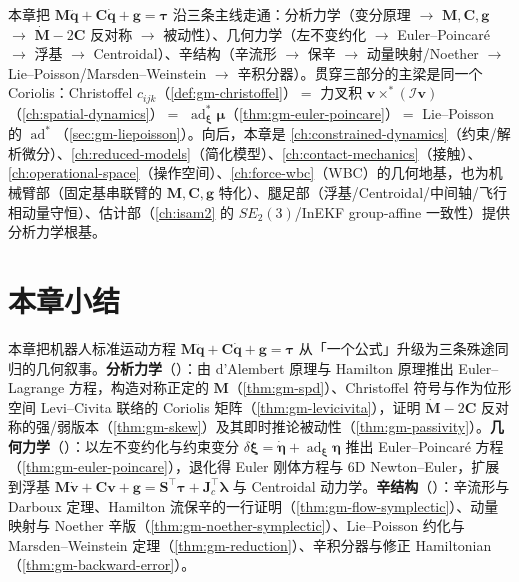 \begin{insight}[本章脉络全景]
本章把 $\mathbf M\ddot{\mathbf q}+\mathbf C\dot{\mathbf q}+\mathbf g=\boldsymbol\tau$ 沿三条主线走通：分析力学（变分原理 $\to$ $\mathbf M,\mathbf C,\mathbf g$ $\to$ $\dot{\mathbf M}-2\mathbf C$ 反对称 $\to$ 被动性）、几何力学（左不变约化 $\to$ Euler--Poincaré $\to$ 浮基 $\to$ Centroidal）、辛结构（辛流形 $\to$ 保辛 $\to$ 动量映射/Noether $\to$ Lie--Poisson/Marsden--Weinstein $\to$ 辛积分器）。贯穿三部分的主梁是同一个 Coriolis：Christoffel $c_{ijk}$（\cref{def:gm-christoffel}）$=$ 力叉积 $\mathbf v\times^*(\boldsymbol{\mathcal I}\mathbf v)$（\cref{ch:spatial-dynamics}）$=$ $\operatorname{ad}^*_{\boldsymbol\xi}\boldsymbol\mu$（\cref{thm:gm-euler-poincare}）$=$ Lie--Poisson 的 $\operatorname{ad}^*$（\cref{sec:gm-liepoisson}）。向后，本章是 \cref{ch:constrained-dynamics}（约束/解析微分）、\cref{ch:reduced-models}（简化模型）、\cref{ch:contact-mechanics}（接触）、\cref{ch:operational-space}（操作空间）、\cref{ch:force-wbc}（WBC）的几何地基，也为机械臂部（固定基串联臂的 $\mathbf M,\mathbf C,\mathbf g$ 特化）、腿足部（浮基/Centroidal/中间轴/飞行相动量守恒）、估计部（\cref{ch:isam2} 的 $SE_2(3)$/InEKF group-affine 一致性\cite{barrau2017invariant}\cite{hartley2020contact}）提供分析力学根基。
\end{insight}

\section*{本章小结}

本章把机器人标准运动方程 $\mathbf M\ddot{\mathbf q}+\mathbf C\dot{\mathbf q}+\mathbf g=\boldsymbol\tau$ 从「一个公式」升级为三条殊途同归的几何叙事。\textbf{分析力学}（）：由 d'Alembert 原理与 Hamilton 原理推出 Euler--Lagrange 方程，构造对称正定的 $\mathbf M$（\cref{thm:gm-spd}）、Christoffel 符号与作为位形空间 Levi--Civita 联络的 Coriolis 矩阵（\cref{thm:gm-levicivita}），证明 $\dot{\mathbf M}-2\mathbf C$ 反对称的强/弱版本（\cref{thm:gm-skew}）及其即时推论被动性（\cref{thm:gm-passivity}）。\textbf{几何力学}（）：以左不变约化与约束变分 $\delta\boldsymbol\xi=\dot{\boldsymbol\eta}+\operatorname{ad}_{\boldsymbol\xi}\boldsymbol\eta$ 推出 Euler--Poincaré 方程（\cref{thm:gm-euler-poincare}），退化得 Euler 刚体方程与 $6$D Newton--Euler，扩展到浮基 $\mathbf M\dot{\mathbf v}+\mathbf C\mathbf v+\mathbf g=\mathbf S^\top\boldsymbol\tau+\mathbf J_c^\top\boldsymbol\lambda$ 与 Centroidal 动力学。\textbf{辛结构}（）：辛流形与 Darboux 定理、Hamilton 流保辛的一行证明（\cref{thm:gm-flow-symplectic}）、动量映射与 Noether 辛版（\cref{thm:gm-noether-symplectic}）、Lie--Poisson 约化与 Marsden--Weinstein 定理（\cref{thm:gm-reduction}）、辛积分器与修正 Hamiltonian（\cref{thm:gm-backward-error}）。

